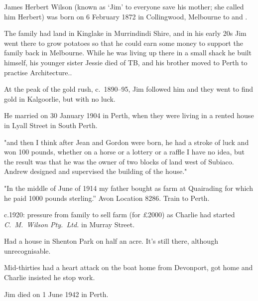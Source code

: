 
James Herbert Wilson (known as `Jim' to everyone save his mother; she called him Herbert)
was born on 6 February 1872 in Collingwood, Melbourne\cite{VicPioneers} to  and .

The family had land in Kinglake in Murrindindi Shire,\cite{VicNames}
and in his early 20s Jim went there to grow potatoes so that he could earn some money to support the family\cite{rae1} back in Melbourne.
While he was living up there in a small shack he built himself, his younger sister Jessie died of TB,
and his brother  moved to Perth to practise Architecture.\cite{rae1}.

At the peak of the gold rush, c.~1890--95, Jim followed him and they went to find gold in Kalgoorlie, but with no luck\cite{rae1}.

He married  on 30 January 1904 in Perth\cite{JimEdithMarriage, JimEdithMarriageCert},
when they were living in a rented house in Lyall Street in South Perth.\cite{rae1}

"and then I think after Jean and Gordon were born, he had a stroke of luck and won 100 pounds, whether on a horse or a lottery or a raffle I have no idea, but the result was that he was the owner of two blocks of land west of Subiaco. Andrew designed and supervised the building of the house."\cite{rae1}

"In the middle of June of 1914 my father bought as farm at Quairading for which he paid 1000 pounds sterling.''\cite{rae2}
Avon Location 8286. Train to Perth.

c.1920: pressure from family to sell farm (for £2000) as Charlie had started \emph{C.~M.\ Wilson Pty.\ Ltd.} in Murray Street.\cite{rae2}

Had a house in Shenton Park on half an acre. It's still there, although unrecognisable.

Mid-thirties had a heart attack on the boat home from Devonport, got home and Charlie insisted he stop work.\cite{rae2}

Jim died on 1 June 1942 in Perth.\cite{rae2}
